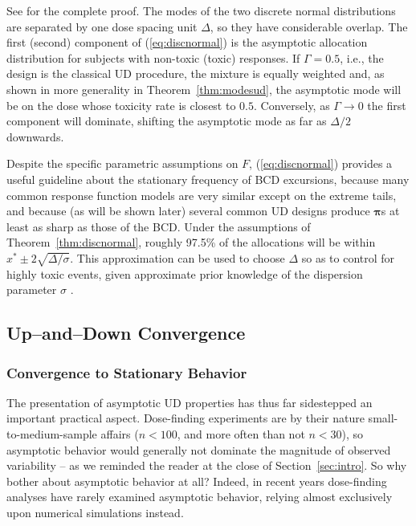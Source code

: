 See \cite{Durh:Flou:rand:1994} for the complete proof. The modes of the two discrete normal distributions are separated by one dose spacing unit $\Delta$, so they have considerable overlap. The first (second) component of (\ref{eq:discnormal}) is the asymptotic allocation distribution for subjects with non-toxic (toxic) responses. If $\Gamma=0.5$, i.e., the design is the classical UD procedure, the mixture is equally weighted and, as shown in more generality in Theorem~\ref{thm:modesud}, the asymptotic mode will be on the dose whose toxicity rate is closest to $0.5$. Conversely, as $\Gamma\to 0$ the first component will dominate, shifting the asymptotic mode as far as $\Delta/2$ downwards.

Despite the specific parametric assumptions on $F$,  (\ref{eq:discnormal}) provides a useful guideline about the stationary frequency of BCD excursions, because many common response function models are very similar except on the extreme tails, and because (as will be shown later) several common UD designs produce $\boldsymbol{\pi}$s at least as sharp as those of the BCD. Under the assumptions of Theorem~\ref{thm:discnormal}, roughly 97.5\% of the allocations will be within $x^*\pm 2\sqrt{\Delta/\sigma}$.  This approximation can be used to choose $\Delta$ so as to control for highly toxic events, given approximate prior knowledge of the dispersion parameter $\sigma$ \citep{Durh:Flou:Rose:rand:1997}.

\subsection{Up--and--Down Convergence}

\subsubsection{Convergence to Stationary Behavior}\label{sec:geom}

The presentation of asymptotic UD properties has thus far sidestepped an important practical aspect. Dose-finding experiments are by their nature small-to-medium-sample affairs ($n<100$, and more often than not $n<30$), so asymptotic behavior would generally not dominate the magnitude of observed variability -- as we reminded the reader at the close of Section~\ref{sec:intro}. So why bother about asymptotic behavior at all? Indeed, in recent years dose-finding analyses have rarely examined asymptotic behavior, relying almost exclusively upon numerical simulations instead.

